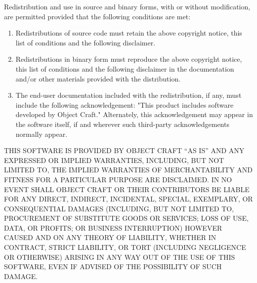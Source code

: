 \centerline{}

Redistribution and use in source and binary forms, with or without
modification, are permitted provided that the following conditions
are met:

\begin{enumerate}

\item
Redistributions of source code must retain the above copyright
notice, this list of conditions and the following disclaimer. 

\item
Redistributions in binary form must reproduce the above copyright
notice, this list of conditions and the following disclaimer in the
documentation and/or other materials provided with the distribution.

\item
The end-user documentation included with the redistribution, if any,
must include the following acknowledgement: "This product includes
software developed by Object Craft." Alternately, this
acknowledgement may appear in the software itself, if and wherever such
third-party acknowledgements normally appear.

\end{enumerate}

THIS SOFTWARE IS PROVIDED BY OBJECT CRAFT ``AS IS'' AND ANY EXPRESSED
OR IMPLIED WARRANTIES, INCLUDING, BUT NOT LIMITED TO, THE IMPLIED
WARRANTIES OF MERCHANTABILITY AND FITNESS FOR A PARTICULAR PURPOSE ARE
DISCLAIMED.  IN NO EVENT SHALL OBJECT CRAFT OR THEIR CONTRIBUTORS BE
LIABLE FOR ANY DIRECT, INDIRECT, INCIDENTAL, SPECIAL, EXEMPLARY, OR
CONSEQUENTIAL DAMAGES (INCLUDING, BUT NOT LIMITED TO, PROCUREMENT OF
SUBSTITUTE GOODS OR SERVICES; LOSS OF USE, DATA, OR PROFITS; OR
BUSINESS INTERRUPTION) HOWEVER CAUSED AND ON ANY THEORY OF LIABILITY,
WHETHER IN CONTRACT, STRICT LIABILITY, OR TORT (INCLUDING NEGLIGENCE
OR OTHERWISE) ARISING IN ANY WAY OUT OF THE USE OF THIS SOFTWARE, EVEN
IF ADVISED OF THE POSSIBILITY OF SUCH DAMAGE.
